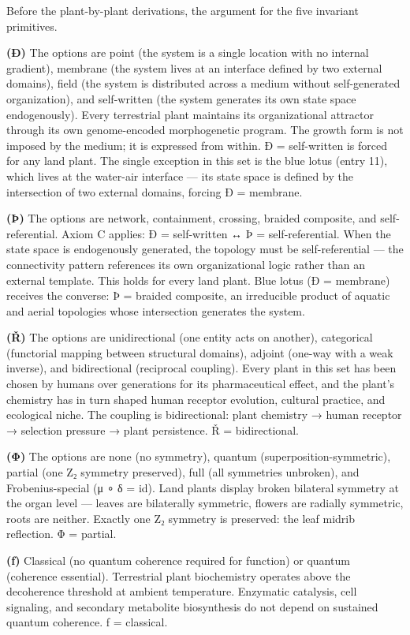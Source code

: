 \documentclass[12pt,a4paper]{article}
\begin{document}
Before the plant-by-plant derivations, the argument for the five
invariant primitives.

\textbf{(Ð)} The options are point (the system is a single location with
no internal gradient), membrane (the system lives at an interface
defined by two external domains), field (the system is distributed
across a medium without self-generated organization), and self-written
(the system generates its own state space endogenously). Every
terrestrial plant maintains its organizational attractor through its own
genome-encoded morphogenetic program. The growth form is not imposed by
the medium; it is expressed from within. Ð = self-written is forced for
any land plant. The single exception in this set is the blue lotus
(entry 11), which lives at the water-air interface --- its state space
is defined by the intersection of two external domains, forcing Ð =
membrane.

\textbf{(Þ)} The options are network, containment, crossing, braided
composite, and self-referential. Axiom C applies: Ð = self-written ↔ Þ =
self-referential. When the state space is endogenously generated, the
topology must be self-referential --- the connectivity pattern
references its own organizational logic rather than an external
template. This holds for every land plant. Blue lotus (Ð = membrane)
receives the converse: Þ = braided composite, an irreducible product of
aquatic and aerial topologies whose intersection generates the system.

\textbf{(Ř)} The options are unidirectional (one entity acts on
another), categorical (functorial mapping between structural domains),
adjoint (one-way with a weak inverse), and bidirectional (reciprocal
coupling). Every plant in this set has been chosen by humans over
generations for its pharmaceutical effect, and the plant's chemistry has
in turn shaped human receptor evolution, cultural practice, and
ecological niche. The coupling is bidirectional: plant chemistry → human
receptor → selection pressure → plant persistence. Ř = bidirectional.

\textbf{(Φ)} The options are none (no symmetry), quantum
(superposition-symmetric), partial (one Z₂ symmetry preserved), full
(all symmetries unbroken), and Frobenius-special (μ ∘ δ = id). Land
plants display broken bilateral symmetry at the organ level --- leaves
are bilaterally symmetric, flowers are radially symmetric, roots are
neither. Exactly one Z₂ symmetry is preserved: the leaf midrib
reflection. Φ = partial.

\textbf{(ƒ)} Classical (no quantum coherence required for function) or
quantum (coherence essential). Terrestrial plant biochemistry operates
above the decoherence threshold at ambient temperature. Enzymatic
catalysis, cell signaling, and secondary metabolite biosynthesis do not
depend on sustained quantum coherence. ƒ = classical.
\end{document}

